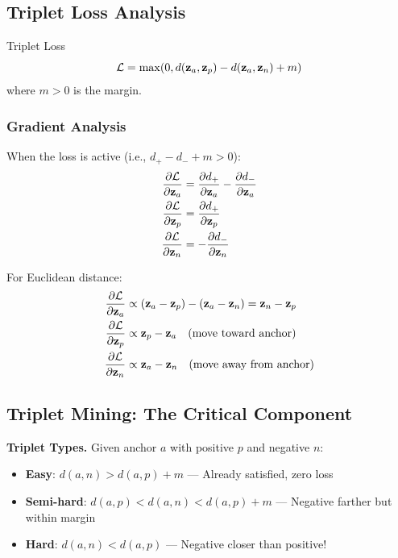 \subsection{Triplet Loss Analysis}

\begin{mathresult}{Triplet Loss}
\begin{equation}
\mathcal{L} = \max(0, d(\mathbf{z}_a, \mathbf{z}_p) - d(\mathbf{z}_a, \mathbf{z}_n) + m)
\end{equation}
where $m > 0$ is the margin.
\end{mathresult}

\subsubsection{Gradient Analysis}

When the loss is active (i.e., $d_+ - d_- + m > 0$):
\begin{align}
\frac{\partial \mathcal{L}}{\partial \mathbf{z}_a} &= \frac{\partial d_+}{\partial \mathbf{z}_a} - \frac{\partial d_-}{\partial \mathbf{z}_a} \\
\frac{\partial \mathcal{L}}{\partial \mathbf{z}_p} &= \frac{\partial d_+}{\partial \mathbf{z}_p} \\
\frac{\partial \mathcal{L}}{\partial \mathbf{z}_n} &= -\frac{\partial d_-}{\partial \mathbf{z}_n}
\end{align}

For Euclidean distance:
\begin{align}
\frac{\partial \mathcal{L}}{\partial \mathbf{z}_a} &\propto (\mathbf{z}_a - \mathbf{z}_p) - (\mathbf{z}_a - \mathbf{z}_n) = \mathbf{z}_n - \mathbf{z}_p \\
\frac{\partial \mathcal{L}}{\partial \mathbf{z}_p} &\propto \mathbf{z}_p - \mathbf{z}_a \quad \text{(move toward anchor)} \\
\frac{\partial \mathcal{L}}{\partial \mathbf{z}_n} &\propto \mathbf{z}_a - \mathbf{z}_n \quad \text{(move away from anchor)}
\end{align}

\subsection{Triplet Mining: The Critical Component}

\textbf{Triplet Types.} Given anchor $a$ with positive $p$ and negative $n$:
\begin{itemize}
    \item \textbf{Easy}: $d(a,n) > d(a,p) + m$ — Already satisfied, zero loss
    \item \textbf{Semi-hard}: $d(a,p) < d(a,n) < d(a,p) + m$ — Negative farther but within margin
    \item \textbf{Hard}: $d(a,n) < d(a,p)$ — Negative closer than positive!
\end{itemize}

